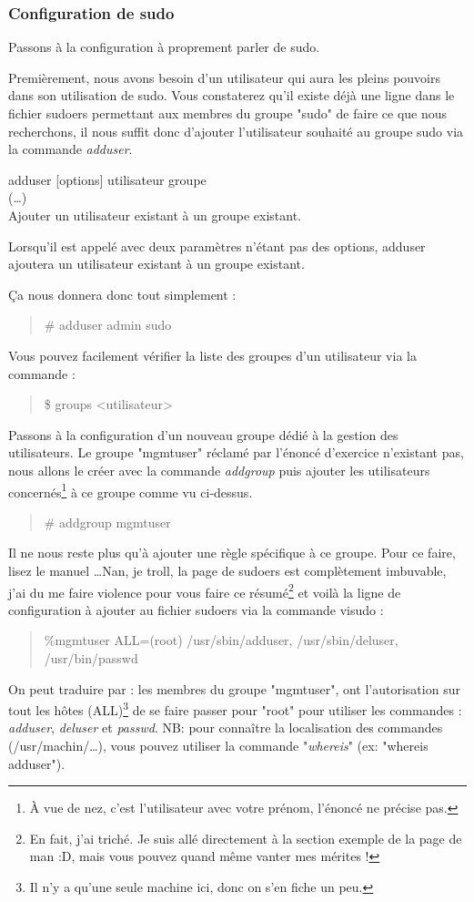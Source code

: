 \documentclass[a4paper,11pt]{article}
\newcommand{\commande}[1] {
    \begin{quote}
    \tt\raggedright #1
    \end{quote}
}
\newcommand{\man}[2]{
    \begin{tcolorbox}[toprule=3mm,width=\textwidth,outer arc=0mm,colbacktitle=grayman,coltitle=black,colback={grayman},colframe={grayman},title={man : \tt #1}]
        \tt\raggedright #2
    \end{tcolorbox}
}
\newcommand{\mandesc}[1]{
    \begin{adjustwidth}{0.8cm}{}
        #1
    \end{adjustwidth}
}
\begin{document}
\subsubsection{Configuration de sudo}
\par Passons à la configuration à proprement parler de sudo.
\par Premièrement, nous avons besoin d'un utilisateur qui aura les pleins pouvoirs dans son utilisation de sudo. Vous constaterez qu'il existe déjà une ligne dans le fichier sudoers permettant aux membres du groupe "sudo" de faire ce que nous recherchons, il nous suffit donc d'ajouter l'utilisateur souhaité au groupe sudo via la commande \emph{adduser}.
\man{adduser}{adduser [options] utilisateur groupe\\
(\dots)\\
Ajouter un utilisateur existant à un groupe existant.
\mandesc{Lorsqu'il est appelé avec deux paramètres n'étant pas des options, adduser ajoutera un utilisateur existant à un groupe existant.}}
\par Ça nous donnera donc tout simplement :
\commande{\# adduser admin sudo}
\par Vous pouvez facilement vérifier la liste des groupes d'un utilisateur via la commande :
\commande{\$ groups <utilisateur>}
\par Passons à la configuration d'un nouveau groupe dédié à la gestion des utilisateurs. Le groupe "mgmtuser" réclamé par l'énoncé d'exercice n'existant pas, nous allons le créer avec la commande \emph{addgroup} puis ajouter les utilisateurs concernés\footnote{À vue de nez, c'est l'utilisateur avec votre prénom, l'énoncé ne précise pas.} à ce groupe comme vu ci-dessus.
\commande{\# addgroup mgmtuser}
\par Il ne nous reste plus qu'à ajouter une règle spécifique à ce groupe. Pour ce faire, lisez le manuel \dots Nan, je troll, la page de sudoers est complètement imbuvable, j'ai du me faire violence pour vous faire ce résumé\footnote{En fait, j'ai triché. Je suis allé directement à la section exemple de la page de man :D, mais vous pouvez quand même vanter mes mérites !} et voilà la ligne de configuration à ajouter au fichier sudoers via la commande visudo :
\commande{\%mgmtuser ALL=(root) /usr/sbin/adduser, /usr/sbin/deluser, /usr/bin/passwd}
\par On peut traduire par : les membres du groupe "mgmtuser", ont l'autorisation sur tout les hôtes (ALL)\footnote{Il n'y a qu'une seule machine ici, donc on s'en fiche un peu.} de se faire passer pour "root" pour utiliser les commandes : \emph{adduser}, \emph{deluser} et \emph{passwd}. NB: pour connaître la localisation des commandes (/usr/machin/\dots), vous pouvez utiliser la commande "\emph{whereis}" (ex: "whereis adduser").
\end{document}
